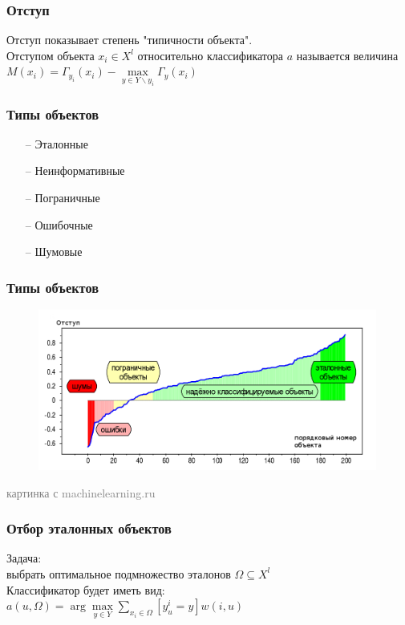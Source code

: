 \documentclass[12pt]{beamer}
\begin{document}
\begin{frame}\frametitle{Отступ}
Отступ показывает степень "типичности объекта".\\
\vspace{5mm}
Отступом объекта ${x_i \in X^l}$ относительно классификатора $a$ называется величина\\
${M(x_i) = \Gamma_{y_i}(x_i) - \max\limits_{y \in Y\backslash y_i} \Gamma_y(x_i)}$

\end{frame}

\begin{frame}\frametitle{Типы объектов}
\begin{itemize}
	\item[--] Эталонные
	\item[--] Неинформативные
	\item[--] Пограничные	
	\item[--] Ошибочные	
	\item[--] Шумовые	
\end{itemize}
\end{frame}

\begin{frame}\frametitle{Типы объектов}

\begin{figure}[htbp]
\centering
\includegraphics[height=150pt]{margin}  
\end{figure}

\textcolor{gray}{картинка с machinelearning.ru}
\end{frame}

\begin{frame}\frametitle{Отбор эталонных объектов}
Задача:\\
выбрать оптимальное подмножество эталонов $\Omega\subseteq X^l$\\ 
\vspace{5mm}
Классификатор будет иметь вид:\\
${a(u, \Omega) = \arg\max\limits_{y \in Y} \sum\limits_{x_i \in \Omega} [y_u^i = y]w(i, u) }$\\
\end{frame}
\end{document}
